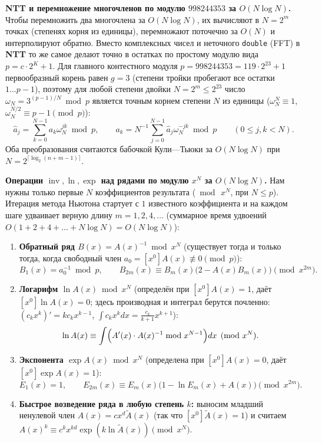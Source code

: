 \documentclass[10pt,a4paper]{article}
\renewcommand{\le}{\leqslant}
\DeclareMathOperator{\inv}{inv}
\begin{document}
\textbf{NTT и перемножение многочленов по модулю $998244353$ за $O(N \log N)$.} Чтобы перемножить два многочлена за $O(N \log N)$, их вычисляют в $N = 2^m$ точках (степенях корня из единицы), перемножают поточечно за $O(N)$ и интерполируют обратно. Вместо комплексных чисел и неточного \texttt{double} (FFT) в \textbf{NTT} то же самое делают точно в остатках по простому модулю вида $p = c \cdot 2^K + 1$. Для главного контестного модуля $p = 998244353 = 119 \cdot 2^{23} + 1$ первообразный корень равен $g = 3$ (степени тройки пробегают все остатки $1 \dots p - 1$), поэтому для любой степени двойки $N = 2^m \le 2^{23}$ число $\omega_N = 3^{(p - 1) / N} \bmod p$ является точным корнем степени $N$ из единицы ($\omega_N^N \equiv 1$, $\omega_N^{N/2} \equiv p - 1 \pmod p$):
\[
  \hat{a}_j = \sum_{k=0}^{N - 1} a_k \omega_N^{jk} \bmod p, \qquad
  a_k = N^{-1} \sum_{j=0}^{N - 1} \hat{a}_j \omega_N^{-jk} \bmod p \qquad (0 \le j, k < N).
\]
Оба преобразования считаются бабочкой Кули—Тьюки за $O(N \log N)$ при $N = 2^{\lceil \log_2(n + m - 1) \rceil}$.

\textbf{Операции $\inv, \ln, \exp$ над рядами по модулю $x^N$ за $O(N \log N)$.} Нам нужны только первые $N$ коэффициентов результата ($\bmod\, x^N$, при $N \le p$). Итерация метода Ньютона стартует с $1$ известного коэффициента и на каждом шаге удваивает верную длину $m = 1, 2, 4, \dots$ (суммарное время удвоений $O(1 + 2 + 4 + \dots + N \log N) = O(N \log N)$):
\begin{enumerate}
  \item \textbf{Обратный ряд $B(x) = A(x)^{-1} \bmod x^N$} (существует тогда и только тогда, когда свободный член $a_0 = [x^0]A(x) \not\equiv 0 \pmod p$):
  \[
    B_1(x) = a_0^{-1} \bmod p, \qquad
    B_{2m}(x) \equiv B_m(x)\bigl(2 - A(x)B_m(x)\bigr) \pmod{x^{2m}}.
  \]
  \item \textbf{Логарифм $\ln A(x) \bmod x^N$} (определён при $[x^0]A(x) = 1$, даёт $[x^0]\ln A(x) = 0$; здесь производная и интеграл берутся почленно: $(c_k x^k)' = k c_k x^{k - 1}$, $\int c_k x^k dx = \frac{c_k}{k + 1} x^{k + 1}$):
  \[
    \ln A(x) \equiv \int \Bigl(A'(x) \cdot A(x)^{-1} \bmod x^{N - 1}\Bigr) dx \pmod{x^N}.
  \]
  \item \textbf{Экспонента $\exp A(x) \bmod x^N$} (определена при $[x^0]A(x) = 0$, даёт $[x^0]\exp A(x) = 1$):
  \[
    E_1(x) = 1, \qquad
    E_{2m}(x) \equiv E_m(x)\bigl(1 - \ln E_m(x) + A(x)\bigr) \pmod{x^{2m}}.
  \]
  \item \textbf{Быстрое возведение ряда в любую степень $k$:} выносим младший ненулевой член $A(x) = c x^d \tilde{A}(x)$ (так что $[x^0]\tilde{A}(x) = 1$) и считаем $A(x)^k \equiv c^k x^{kd} \exp(k \ln \tilde{A}(x)) \pmod{x^N}$.
\end{enumerate}
\end{document}
